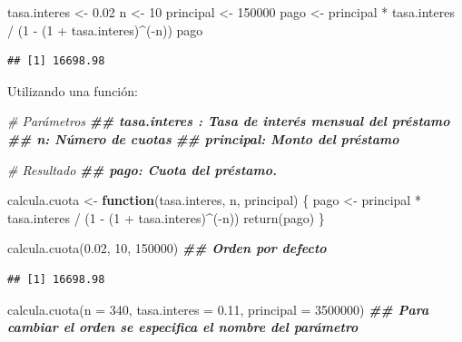 \documentclass[
  12pt,
]{book}
\newenvironment{Shaded}{\begin{snugshade}}{\end{snugshade}}
\newcommand{\AttributeTok}[1]{\textcolor[rgb]{0.77,0.63,0.00}{#1}}
\newcommand{\CommentTok}[1]{\textcolor[rgb]{0.56,0.35,0.01}{\textit{#1}}}
\newcommand{\ControlFlowTok}[1]{\textcolor[rgb]{0.13,0.29,0.53}{\textbf{#1}}}
\newcommand{\DecValTok}[1]{\textcolor[rgb]{0.00,0.00,0.81}{#1}}
\newcommand{\DocumentationTok}[1]{\textcolor[rgb]{0.56,0.35,0.01}{\textbf{\textit{#1}}}}
\newcommand{\FloatTok}[1]{\textcolor[rgb]{0.00,0.00,0.81}{#1}}
\newcommand{\FunctionTok}[1]{\textcolor[rgb]{0.00,0.00,0.00}{#1}}
\newcommand{\NormalTok}[1]{#1}
\newcommand{\OtherTok}[1]{\textcolor[rgb]{0.56,0.35,0.01}{#1}}
\newcommand{\SpecialCharTok}[1]{\textcolor[rgb]{0.00,0.00,0.00}{#1}}
\begin{document}
\begin{Shaded}
\begin{Highlighting}[]
\NormalTok{tasa.interes }\OtherTok{\textless{}{-}} \FloatTok{0.02}
\NormalTok{n }\OtherTok{\textless{}{-}} \DecValTok{10}
\NormalTok{principal }\OtherTok{\textless{}{-}} \DecValTok{150000}
\NormalTok{pago }\OtherTok{\textless{}{-}}\NormalTok{ principal }\SpecialCharTok{*}\NormalTok{ tasa.interes }\SpecialCharTok{/}\NormalTok{ (}\DecValTok{1} \SpecialCharTok{{-}}\NormalTok{ (}\DecValTok{1} \SpecialCharTok{+}\NormalTok{ tasa.interes)}\SpecialCharTok{\^{}}\NormalTok{(}\SpecialCharTok{{-}}\NormalTok{n))}
\NormalTok{pago}
\end{Highlighting}
\end{Shaded}

\begin{verbatim}
## [1] 16698.98
\end{verbatim}

Utilizando una función:

\begin{Shaded}
\begin{Highlighting}[]
\CommentTok{\# Parámetros}
\DocumentationTok{\#\# tasa.interes : Tasa de interés mensual del préstamo}
\DocumentationTok{\#\# n: Número de cuotas}
\DocumentationTok{\#\# principal: Monto del préstamo}

\CommentTok{\# Resultado}
\DocumentationTok{\#\# pago: Cuota del préstamo.}


\NormalTok{calcula.cuota }\OtherTok{\textless{}{-}} \ControlFlowTok{function}\NormalTok{(tasa.interes, n, principal) \{}
\NormalTok{  pago }\OtherTok{\textless{}{-}}\NormalTok{ principal }\SpecialCharTok{*}\NormalTok{ tasa.interes }\SpecialCharTok{/}\NormalTok{ (}\DecValTok{1} \SpecialCharTok{{-}}\NormalTok{ (}\DecValTok{1} \SpecialCharTok{+}\NormalTok{ tasa.interes)}\SpecialCharTok{\^{}}\NormalTok{(}\SpecialCharTok{{-}}\NormalTok{n))}
  \FunctionTok{return}\NormalTok{(pago)}
\NormalTok{\}}


\FunctionTok{calcula.cuota}\NormalTok{(}\FloatTok{0.02}\NormalTok{, }\DecValTok{10}\NormalTok{, }\DecValTok{150000}\NormalTok{) }\DocumentationTok{\#\# Orden por defecto}
\end{Highlighting}
\end{Shaded}

\begin{verbatim}
## [1] 16698.98
\end{verbatim}

\begin{Shaded}
\begin{Highlighting}[]
\FunctionTok{calcula.cuota}\NormalTok{(}\AttributeTok{n =} \DecValTok{340}\NormalTok{, }\AttributeTok{tasa.interes =} \FloatTok{0.11}\NormalTok{, }\AttributeTok{principal =} \DecValTok{3500000}\NormalTok{) }\DocumentationTok{\#\# Para cambiar el orden se especifica el nombre del parámetro}
\end{Highlighting}
\end{Shaded}
\end{document}
